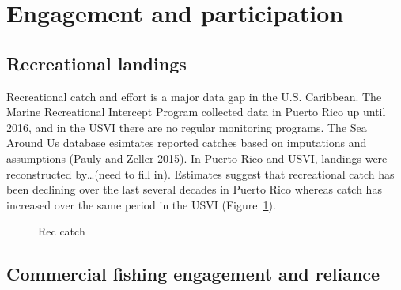 \documentclass[
  letterpaper,
  oneside,
  open=any]{scrbook}
\begin{document}
\section{Engagement and
participation}\label{engagement-and-participation}

\subsection{Recreational landings}\label{recreational-landings}

Recreational catch and effort is a major data gap in the U.S. Caribbean.
The Marine Recreational Intercept Program collected data in Puerto Rico
up until 2016, and in the USVI there are no regular monitoring programs.
The Sea Around Us database esimtates reported catches based on
imputations and assumptions (Pauly and Zeller 2015). In Puerto Rico and
USVI, landings were reconstructed by\ldots(need to fill in). Estimates
suggest that recreational catch has been declining over the last several
decades in Puerto Rico whereas catch has increased over the same period
in the USVI (Figure~\ref{fig-reccatch}).

\begin{figure}


\caption{\label{fig-reccatch}Rec catch}

\end{figure}%

\subsection{Commercial fishing engagement and
reliance}\label{commercial-fishing-engagement-and-reliance}
\end{document}
